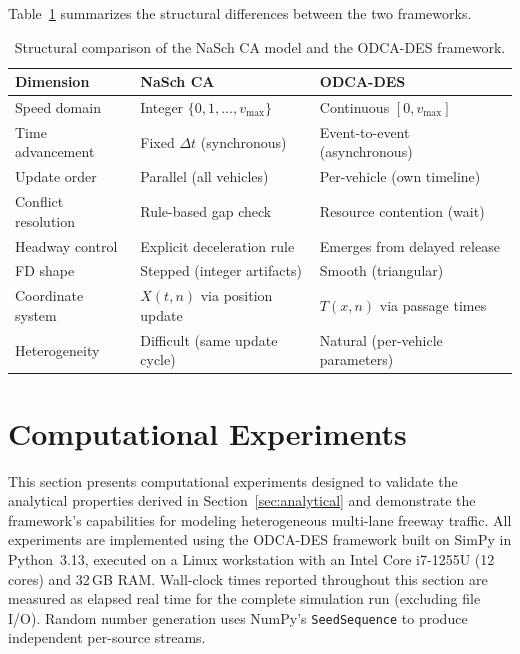 \documentclass[review,authoryear]{elsarticle}
\begin{document}
Table~\ref{tab:comparison_summary} summarizes the structural differences between the two frameworks.

\begin{table}[ht]
\centering
\caption{Structural comparison of the NaSch CA model and the ODCA-DES framework.}
\label{tab:comparison_summary}
\begin{tabular}{@{}lll@{}}
\toprule
Dimension & NaSch CA & ODCA-DES \\
\midrule
Speed domain & Integer $\{0,1,\ldots,v_{\max}\}$ & Continuous $[0, v_{\max}]$ \\
Time advancement & Fixed $\Delta t$ (synchronous) & Event-to-event (asynchronous) \\
Update order & Parallel (all vehicles) & Per-vehicle (own timeline) \\
Conflict resolution & Rule-based gap check & Resource contention (wait) \\
Headway control & Explicit deceleration rule & Emerges from delayed release \\
FD shape & Stepped (integer artifacts) & Smooth (triangular) \\
Coordinate system & $X(t,n)$ via position update & $T(x,n)$ via passage times \\
Heterogeneity & Difficult (same update cycle) & Natural (per-vehicle parameters) \\
\bottomrule
\end{tabular}
\end{table}


\section{Computational Experiments}
\label{sec:experiments}

This section presents computational experiments designed to validate the analytical properties derived in Section~\ref{sec:analytical} and demonstrate the framework's capabilities for modeling heterogeneous multi-lane freeway traffic. All experiments are implemented using the ODCA-DES framework built on SimPy \citep{simpy2023} in Python~3.13, executed on a Linux workstation with an Intel Core i7-1255U (12 cores) and 32\,GB RAM. Wall-clock times reported throughout this section are measured as elapsed real time for the complete simulation run (excluding file I/O). Random number generation uses NumPy's \texttt{SeedSequence} to produce independent per-source streams.
\end{document}
